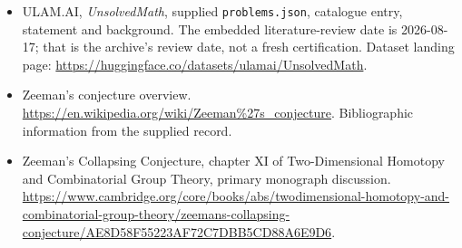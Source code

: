 \documentclass[11pt,a4paper]{article}
\begin{document}
{\small

\begin{itemize}

\item[\hypertarget{source:statement:1}{S1}] ULAM.AI, \emph{UnsolvedMath}, supplied \texttt{problems.json}, catalogue entry, statement and background. The embedded literature-review date is 2026-08-17; that is the archive’s review date, not a fresh certification. Dataset landing page: \url{https://huggingface.co/datasets/ulamai/UnsolvedMath}.

\item[\hypertarget{source:statement:2}{S2}] Zeeman's conjecture overview. \url{https://en.wikipedia.org/wiki/Zeeman%27s_conjecture}. Bibliographic information from the supplied record.

\item[R1] Zeeman’s Collapsing Conjecture, chapter XI of Two-Dimensional Homotopy and Combinatorial Group Theory, primary monograph discussion.
\url{https://www.cambridge.org/core/books/abs/twodimensional-homotopy-and-combinatorial-group-theory/zeemans-collapsing-conjecture/AE8D58F55223AF72C7DBB5CD88A6E9D6}.
\end{itemize}

}

\label{end:statement}
\end{document}
